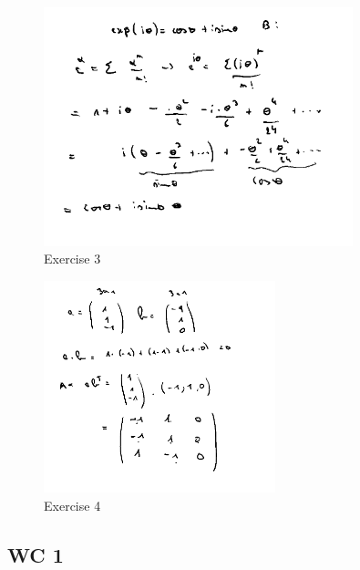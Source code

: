 \documentclass[a4paper]{report}
\begin{document}
\begin{figure}[!htbp]
	\centering
	\includegraphics[width=0.8\textwidth]{assets/huis_1_ex_3.png}
	\caption{Exercise 3}
	\label{fig:huis_1_ex_3}
\end{figure}


\begin{figure}[!htbp]
	\centering
	\includegraphics[width=0.6\textwidth]{assets/huis_1_ex_4.png}
	\caption{Exercise 4}
	\label{fig:huis_1_ex_4}
\end{figure}

\newpage

\subsection*{WC 1}
\end{document}
